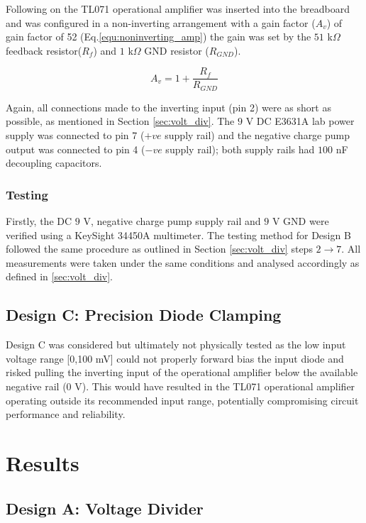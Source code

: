 Following on the TL071 operational amplifier \cite{TI_TL071} was inserted into the breadboard and was configured in a non-inverting arrangement with a gain factor (\(A_v\)) of gain factor of 52 (Eq.\ref{equ:noninverting_amp}) the gain was set by the \(51\) k\(\Omega\) feedback resistor(\(R_{f}\)) and \(1\) k\(\Omega\) GND resistor (\(R_{GND}\)). 

\begin{equation}
    \label{equ:noninverting_amp}
    A_v = 1+\frac{R_f}{R_{GND}}
\end{equation}


Again, all connections made to the inverting input (pin 2) were as short as possible, as mentioned in Section \ref{sec:volt_div}. The \(9\) V DC E3631A lab power supply was connected to pin 7 (\(+ve\) supply rail) and the negative charge pump output was connected to pin 4 (\(-ve\) supply rail); both supply rails had \(100\) nF decoupling capacitors.

\subsubsection{Testing}
Firstly, the DC \(9\) V, negative charge pump supply rail and \(9\) V GND were verified using a KeySight 34450A multimeter. The testing method for Design B followed the same procedure as outlined in Section \ref{sec:volt_div} steps \(2\rightarrow7\). All measurements were taken under the same conditions and analysed accordingly as defined in \ref{sec:volt_div}.

\subsection{Design C: Precision Diode Clamping}
\label{sec:3}
Design C was considered but ultimately not physically tested as the low input voltage range [0,100 mV] could not properly forward bias the input diode and risked pulling the inverting input of the operational amplifier below the available negative rail (\(0\) V). This would have resulted in the TL071 operational amplifier operating outside its recommended input range, potentially compromising circuit performance and reliability.

\section{Results}
\subsection{Design A: Voltage Divider}

